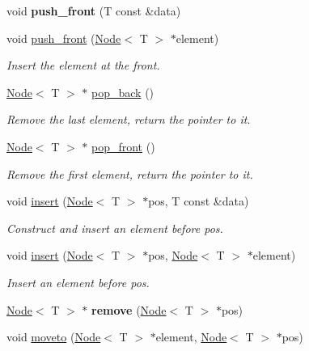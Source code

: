 \begin{DoxyCompactItemize}
\mbox{\label{class_list_ab3a121baf35c7fa3f83717ede3a46e1b}} 
void {\bfseries push\+\_\+front} (T const \&data)
\item 
void \hyperlink{class_list_aeb009afd4f0f626603455d5ee9e3dfc3}{push\+\_\+front} (\hyperlink{struct_node}{Node}$<$ T $>$ $\ast$element)
\begin{DoxyCompactList}\small\item\em Insert the element at the front. \end{DoxyCompactList}\item 
\hyperlink{struct_node}{Node}$<$ T $>$ $\ast$ \hyperlink{class_list_aca64c15e326dd7515499310bc9f2efb0}{pop\+\_\+back} ()
\begin{DoxyCompactList}\small\item\em Remove the last element, return the pointer to it. \end{DoxyCompactList}\item 
\hyperlink{struct_node}{Node}$<$ T $>$ $\ast$ \hyperlink{class_list_a3188f038a0b9c0a578bccdf7348f42b5}{pop\+\_\+front} ()
\begin{DoxyCompactList}\small\item\em Remove the first element, return the pointer to it. \end{DoxyCompactList}\item 
void \hyperlink{class_list_af583e46c2dad89c3f29be38a52dd27bc}{insert} (\hyperlink{struct_node}{Node}$<$ T $>$ $\ast$pos, T const \&data)
\begin{DoxyCompactList}\small\item\em Construct and insert an element before pos. \end{DoxyCompactList}\item 
void \hyperlink{class_list_ac7fcefb285d5b4991be548342f9b86e9}{insert} (\hyperlink{struct_node}{Node}$<$ T $>$ $\ast$pos, \hyperlink{struct_node}{Node}$<$ T $>$ $\ast$element)
\begin{DoxyCompactList}\small\item\em Insert an element before pos. \end{DoxyCompactList}\item 
\mbox{\label{class_list_a835180f96db12ee4793c77562fbf02be}} 
\hyperlink{struct_node}{Node}$<$ T $>$ $\ast$ {\bfseries remove} (\hyperlink{struct_node}{Node}$<$ T $>$ $\ast$pos)
\item 
void \hyperlink{class_list_a5bfb723e873c6af1e03b085a24ad62f4}{moveto} (\hyperlink{struct_node}{Node}$<$ T $>$ $\ast$element, \hyperlink{struct_node}{Node}$<$ T $>$ $\ast$pos)

\end{DoxyCompactItemize}
